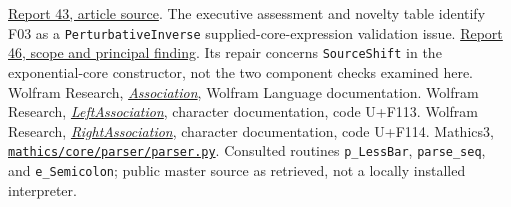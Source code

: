 \documentclass[11pt,letterpaper]{article}
\newcommand{\code}[1]{\nolinkurl{#1}}
\newcommand{\src}[2]{\href{https://github.com/VladimirReshetnikov/Asymptotic/blob/efa1aeec4845a9c35e140963a0333d0c9ec33b05/#1}{#2}}
\begin{document}
\begin{thebibliography}{99}
 \src{external-reports/code-review/wave-5/code-review-43/article/article.tex}{Report 43, article source}. The executive assessment and novelty table identify F03 as a \code{PerturbativeInverse} supplied-core-expression validation issue.
 \src{external-reports/code-review/wave-6/code-review-46/README.md}{Report 46, scope and principal finding}. Its repair concerns \code{SourceShift} in the exponential-core constructor, not the two component checks examined here.
 Wolfram Research, \href{https://reference.wolfram.com/language/ref/Association.html}{\emph{Association}}, Wolfram Language documentation.
 Wolfram Research, \href{https://reference.wolfram.com/language/ref/character/LeftAssociation.html}{\emph{LeftAssociation}}, character documentation, code U+F113.
 Wolfram Research, \href{https://reference.wolfram.com/language/ref/character/RightAssociation.html}{\emph{RightAssociation}}, character documentation, code U+F114.
 Mathics3, \href{https://github.com/Mathics3/mathics-core/blob/master/mathics/core/parser/parser.py}{\code{mathics/core/parser/parser.py}}. Consulted routines \code{p_LessBar}, \code{parse_seq}, and \code{e_Semicolon}; public master source as retrieved, not a locally installed interpreter.
\end{thebibliography}
\end{document}
